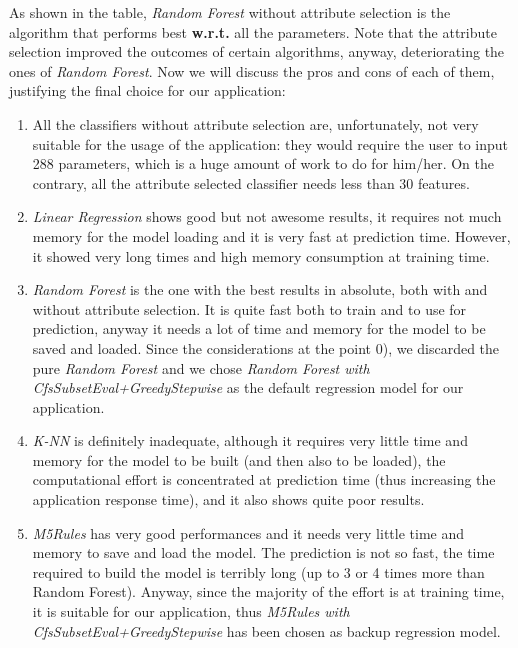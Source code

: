 \begin{longtable}{| m{18em} | m{5em} | m{8em} | m{8em} |}
	\end{longtable}

\endgroup


As shown in the table, \textit{Random Forest} without attribute selection is the algorithm that performs best \textbf{w.r.t.} all the parameters. Note that the attribute selection improved the outcomes of certain algorithms, anyway, deteriorating the ones of \textit{Random Forest}.
Now we will discuss the pros and cons of each of them, justifying the final choice for our application:

\begin{enumerate}
	\item All the classifiers without attribute selection are, unfortunately, not very suitable for the usage of the application: they would require the user to input 288 parameters, which is a huge amount of work to do for him/her. On the contrary, all the attribute selected classifier needs less than 30 features.
	\item \textit{Linear Regression} shows good but not awesome results, it requires not much memory for the model loading and it is very fast at prediction time. However, it showed very long times and high memory consumption at training time.
	\item \textit{Random Forest} is the one with the best results in absolute, both with and without attribute selection. It is quite fast both to train and to use for prediction, anyway it needs a lot of time and memory for the model to be saved and loaded. Since the considerations at the point 0), we discarded the pure \textit{Random Forest} and we chose \textit{Random Forest with CfsSubsetEval+GreedyStepwise} as the default regression model for our application.
	\item \textit{K-NN} is definitely inadequate, although it requires very little time and memory for the model to be built (and then also to be loaded), the computational effort is concentrated at prediction time (thus increasing the application response time), and it also shows quite poor results.
	\item \textit{M5Rules} has very good performances and it needs very little time and memory to save and load the model. The prediction is not so fast, the time required to build the model is terribly long (up to 3 or 4 times more than Random Forest). Anyway, since the majority of the effort is at training time, it is suitable for our application, thus \textit{M5Rules with CfsSubsetEval+GreedyStepwise} has been chosen as backup regression model.
\end{enumerate}

